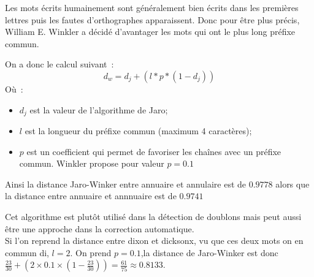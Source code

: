 \documentclass[final, 10pt]{report}
\begin{document}
    Les mots écrits humainement sont généralement bien écrits dans les premières lettres puis les fautes d'orthographes apparaissent.
    Donc pour être plus précis, William E. Winkler a décidé d'avantager les mots qui ont le plus long préfixe commun.
    
    On a donc le calcul suivant~:
    $$ d_w = d_j +(l * p * (1-d_j) )$$
    Où~:
    \begin{itemize}
        \item $d_j$ est la valeur de l'algorithme de Jaro;
        \item $l$ est la longueur du préfixe commun (maximum 4 caractères);
        \item $p$ est un coefficient qui permet de favoriser les chaînes avec un préfixe commun.
        Winkler propose pour valeur $p=0.1$
    \end{itemize}
    
    Ainsi la distance Jaro-Winker entre \fg annuaire\og{} et \fg annulaire\og{} est de $0.9778$ alors que la distance entre \fg annuaire\og{} et \fg annnuaire\og{} est de $0.9741$
    
    Cet algorithme est plutôt utilisé dans la détection de doublons mais peut aussi être une approche dans la correction automatique.\\
    
    Si l'on reprend la distance entre \og dixon\fg{} et \og dicksonx\fg{}, vu que ces deux mots on en commun \og di\fg{}, $l = 2$.
    On prend $p = 0.1$,la distance de Jaro-Winker est donc $\frac{23}{30} + \left( 2 \times 0.1 \times \left( 1 - \frac{23}{30} \right)\right) = \frac{61}{75} \approx 0.8133$.
    
\end{document}
